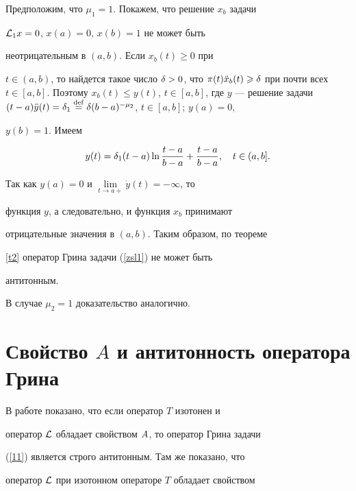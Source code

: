 \begin{pf}


Предположим, что $\mu_1=1$. Покажем, что решение $x_b$ задачи


${\cal L}_1x=0$, $x(a)=0$, $x(b)=1$ не может быть


неотрицательным в $(a,b)$. Если $x_b(t)\ge0$ при


$t\in(a,b)$, то найдется такое число $\d>0$, что $\pi(t)\Ddot


x_b(t)\ge\d$ при почти всех $t\in[a,b]$. Поэтому $x_b(t)\le


y(t)$, $t\in[a,b]$, где $y$ --- решение задачи $(t-a)\Ddot


y(t)=\d_1\df \d (b-a)^{-\mu_2}$, $t\in[a,b]$; $y(a)=0$,


$y(b)=1$. Имеем


$$


y(t)=\d_1(t-a)\ln\frac{t-a}{b-a}+\frac{t-a}{b-a},\quad


t\in(a,b].


$$


Так как $y(a)=0$ и $\lim\limits_{t\to a+}\Dot y(t)=-\infty$, то


функция $y$, а следовательно, и функция $x_b$ принимают


отрицательные значения в $(a,b)$. Таким образом, по теореме


\ref{t2} оператор Грина задачи (\ref{zsl1}) не может быть


антитонным.





В случае $\mu_2=1$ доказательство аналогично.


\end{pf}





\section{Свойство $A$ и антитонность оператора Грина}





В работе \cite{AAB} показано, что если оператор $T$ изотонен и


оператор ${\cal L}$ обладает свойством $A$, то оператор Грина задачи


(\ref{11}) является строго антитонным. Там же показано, что


оператор ${\cal L}$ при изотонном операторе $T$ обладает свойством


